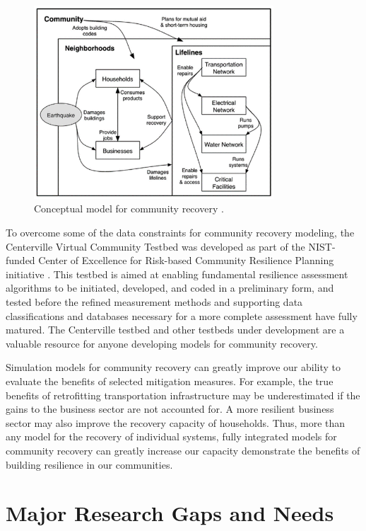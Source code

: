 \begin{figure}[htb]
    \centering
    \includegraphics[width=0.8\textwidth, angle = 0]{Figures/CommunityRecovery.png}
    \caption{Conceptual model for community recovery \citep{miles2003urban}.}
    \label{fig:CommunityRecovery}
\end{figure}

To overcome some of the data constraints for community recovery modeling, the Centerville Virtual Community Testbed was developed as part of the NIST-funded Center of Excellence for Risk-based Community Resilience Planning initiative \citep{Ellingwood2016}. This testbed is aimed at enabling fundamental resilience assessment algorithms to be initiated, developed, and coded in a preliminary form, and tested before the refined measurement methods and supporting data classifications and databases necessary for a more complete assessment have fully matured. The Centerville testbed and other testbeds under development are a valuable resource for anyone developing models for community recovery.\ 

Simulation models for community recovery can greatly improve our ability to evaluate the benefits of selected mitigation measures. For example, the true benefits of retrofitting transportation infrastructure may be underestimated if the gains to the business sector are not accounted for. A more resilient business sector may also improve the recovery capacity of households. Thus, more than any model for the recovery of individual systems, fully integrated models for community recovery can greatly increase our capacity demonstrate the benefits of building resilience in our communities. 

\FloatBarrier
\section{Major Research Gaps and Needs}

